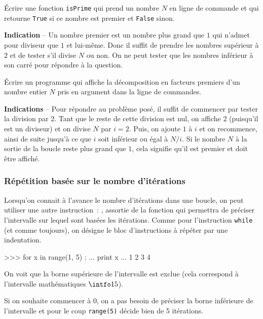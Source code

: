 \begin{exercice}
Écrire une fonction \texttt{isPrime} qui prend un nombre $N$ en ligne de commande et qui retourne \texttt{True} si ce nombre est premier  et \texttt{False} sinon.

\textbf{Indication} -- Un nombre premier est un nombre plus grand que $1$ qui n'admet pour diviseur que $1$ et lui-même. Donc il suffit de prendre les nombres supérieur à $2$ et de tester s'il divise $N$ ou non. On ne peut tester que les nombres inférieur à son carré pour répondre à la question.
\end{exercice}

\begin{exercice}
\label{python:conditions:exos:decompopremiers}
Écrire un programme qui affiche la décomposition en facteurs premiers d'un nombre entier $N$ pris en argument dans la ligne de commandes.

\textbf{Indications} -- Pour répondre au problème posé, il suffit de commencer par tester la division par $2$. Tant que le reste de cette division est nul, on affiche $2$ (puisqu'il est un diviseur) et on divise $N$ par $i=2$. Puis, on ajoute $1$ à $i$ et on recommence, ainsi de suite jusqu'à ce que $i$ soit inférieur ou égal à $N/i$. Si le nombre $N$ à la sortie de la boucle reste plus grand que $1$, cela signifie qu'il est premier et doit être affiché.
\end{exercice}

\subsubsection{Répétition basée sur le nombre d'itérations}
\label{python:conditions:instructions:for}
Lorsqu'on connait à l'avance le nombre d'itérations dans une boucle, on peut utiliser une autre
instruction~: , assortie de la fonction  qui permettra de préciser
l'intervalle sur lequel sont basées les itérations. Comme pour l'instruction \texttt{while}
(et comme toujours), on désigne le bloc d'instructions à répéter par une indentation.

\begin{pythoncode}
>>> for x in range(1, 5) :
...   print x
...
1
2
3
4
\end{pythoncode}

On voit que la borne supérieure de l'intervalle est exclue (cela correspond à l'intervalle
mathématiques $\intfo15$).

Si on souhaite commencer à $0$, on a pas besoin de préciser la borne
inférieure de l'intervalle et pour le coup \texttt{range(5)} décide bien de 5 itérations.

